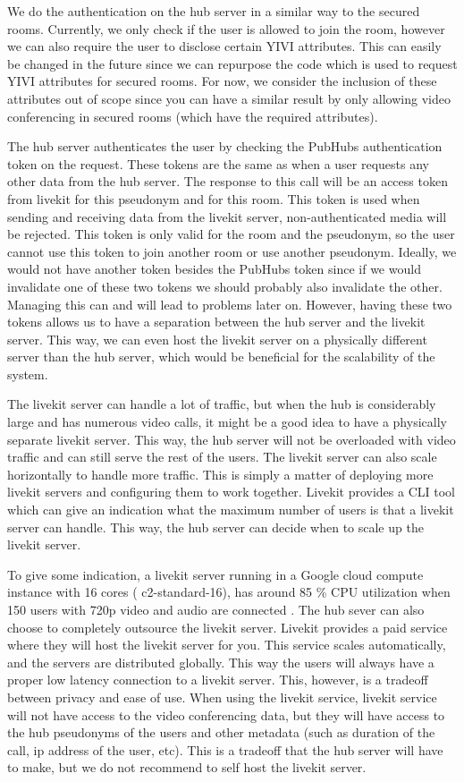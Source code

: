 \documentclass{report}
\begin{document}
We do the authentication on the hub server in a similar way to the secured rooms. Currently, we only check if
the user is allowed to join the room, however we can also require the user to disclose
certain YIVI attributes. This can easily be changed in the future since we can repurpose the code which is used to
request YIVI attributes for secured rooms. For now, we consider the inclusion of these attributes out of scope since
you can have a similar result by only allowing video conferencing in secured rooms (which have the required
attributes).

The hub server authenticates the user by checking the PubHubs authentication token on the request. These tokens are
the same as when a user requests any other data from the hub server. The response to this call will be an
access token from livekit for this pseudonym and for this room. This token is used when sending and receiving data
from the livekit server, non-authenticated media will be rejected. This token is only valid for the room and the
pseudonym, so the user cannot use this token to join another room or use another pseudonym. Ideally, we would not
have another token besides the PubHubs token since if we would invalidate one of these two tokens we should probably
also invalidate the other. Managing this can and will lead to problems later on. However, having these two tokens
allows us to have a separation between the hub server and the livekit server. This way, we can even host the livekit
server on a physically different server than the hub server, which would be beneficial for the scalability of the
system.

The livekit server can handle a lot of traffic, but when the hub is considerably large and has numerous video calls, it
might be a good idea to have a physically separate livekit server. This way, the hub server will not be overloaded with
video traffic and can still serve the rest of the users. The livekit server can also scale horizontally to handle
more traffic. This is simply a matter of deploying more livekit servers and configuring them to work together.
Livekit provides a CLI tool which can give an indication what the maximum number of users is that a livekit server
can handle. This way, the hub server can decide when to scale up the livekit server.

To give some indication, a livekit server running in a Google cloud compute instance with 16 cores (
c2-standard-16), has around 85 \% CPU utilization when 150 users with 720p video and audio are connected
\cite{noauthor_benchmarking_nodate}. The hub sever can also choose to completely outsource the livekit server.
Livekit provides a paid service where they will host the livekit server for you. This service scales
automatically, and the servers are distributed globally. This way the users will always have a proper low
latency connection to a livekit server. This, however, is a tradeoff between privacy and ease of use. When using
the livekit service, livekit service will not have access to the video conferencing data, but they will have access to
the hub pseudonyms of the users and other metadata (such as duration of the call, ip address of the user, etc). This
is a tradeoff that the hub server will have to make, but we do not recommend to self host the livekit server.
\end{document}
